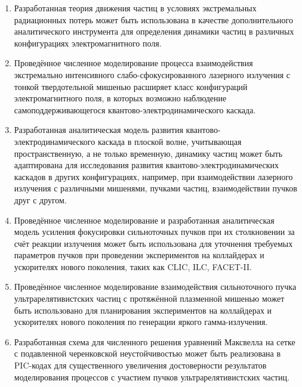 \vspace{0.25cm}
{\influence}
\begin{enumerate}[beginpenalty=10000]
  \item Разработанная теория движения частиц в условиях экстремальных радиационных потерь может быть использована в качестве дополнительного аналитического инструмента для определения динамики частиц в различных конфигурациях электромагнитного поля.
  \item Проведённое численное моделирование процесса взаимодействия экстремально интенсивного слабо-сфокусированного лазерного излучения с тонкой твердотельной мишенью расширяет класс конфигураций электромагнитного поля, в которых возможно наблюдение самоподдерживающегося квантово-электродинамического каскада.
  \item Разработанная аналитическая модель развития квантово-электро\-динамического каскада в плоской волне, учитывающая пространственную, а не только временную, динамику частиц может быть адаптирована для исследования развития квантово-электродинамических каскадов в других конфигурациях, например, при взаимодействии лазерного излучения с различными мишенями, пучками частиц, взаимодействии пучков друг с другом. 
  \item Проведённое численное моделирование и разработанная аналитическая модель усиления фокусировки сильноточных пучков при их столкновении за счёт реакции излучения может быть использована для уточнения требуемых параметров пучков при проведении экспериментов на коллайдерах и ускорителях нового поколения, таких как CLIC, ILC, FACET-II.
  \item Проведённое численное моделирование взаимодействия сильноточного пучка ультрарелятивистских частиц с протяжённой плазменной мишенью может быть использовано для планирования экспериментов на коллайдерах и ускорителях нового поколения по генерации яркого гамма-излучения. 
  \item Разработанная схема для численного решения уравнений Максвелла на сетке с подавленной черенковской неустойчивостью может быть реализована в PIC-кодах для существенного увеличения достоверности результатов моделирования процессов с участием пучков ультрарелятивистских частиц.
\end{enumerate}


